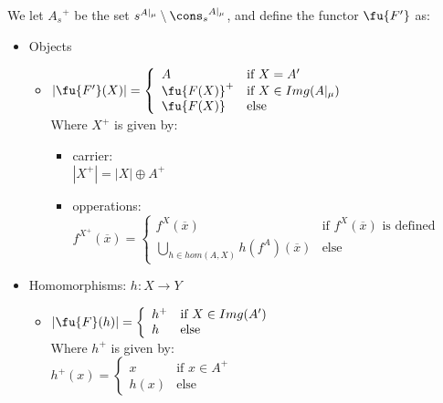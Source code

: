 \begin{PROOF}
We let ${A_s}^+$ be the set $s^{A|_\mu} \setminus {\cons_s}^{A|_\mu}$, and define the functor $\fu{F'}$ as:
	\begin{itemize}
	\item Objects
		\begin{itemize}
		\item $|\fu{F'}(X)|= \left\{\begin{array}{ll}
	A		& \mbox{if } X = A' \\
	\fu{F(X)}^+	& \mbox{if } X \in Img(A|_\mu) \\
	\fu{F(X)}	& \mbox{else}\\
		\end{array}\right.$\\
		Where $X^+$ is given by:
			\begin{itemize}
			\item carrier:\\
		$|X^+| = |X| \oplus A^+$
			\item opperations:\\
			$f^{X^+}(\overline{x})= \left\{\begin{array}{ll}
			f^{X}(\overline{x})	& \mbox{if } f^{X}(\overline{x}) \mbox{ is defined}\\
			\bigcup_{h \in hom(A,X)} h(f^A)(\overline{x}) 	& \mbox{else} 
			\end{array}\right.$
			\end{itemize}
		\end{itemize}

	\item Homomorphisms: $h: X \to Y$
		\begin{itemize}
		\item $|\fu{F}(h)|= \left\{\begin{array}{ll}
	h^+		& \mbox{if }  X \in Img(A') \\
	h		& \mbox{else}\\
		\end{array}\right.$ \\
		Where $h^+$ is given by:\\
			$h^{+}({x})= \left\{\begin{array}{ll}
			{x}	& \mbox{if } x \in A^+ \\
			h(x)	& \mbox{else} 
			\end{array}\right.$
		\end{itemize}
	\end{itemize}


\end{PROOF}



